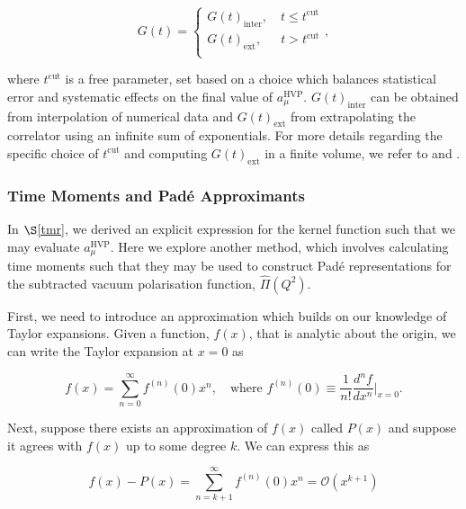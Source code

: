 \documentclass{article}
\numberwithin{equation}{section} %
\begin{document}
\begin{equation}
G(t)=
\begin{cases}
G(t)_{\mathrm{inter}}, \quad t \leq t^{\mathrm{cut}} \\
G(t)_{\mathrm{ext}}, \,\,\,\quad t > t^{\mathrm{cut}} \\
\end{cases},
\end{equation}

\noindent where $t^{\mathrm{cut}}$ is a free parameter, set based on a choice which balances statistical error and systematic effects on the final value of $a_\mu^{\mathrm{HVP}}$. $G(t)_{\mathrm{inter}}$ can be obtained from interpolation of numerical data and $G(t)_{\mathrm{ext}}$ from extrapolating the correlator using an infinite sum of exponentials. For more details regarding the specific choice of $t^{\mathrm{cut}}$ and computing $G(t)_{\mathrm{ext}}$ in a finite volume, we refer to \cite{dellamorte} and \cite{vector}.

\subsubsection{Time Moments and Pad\'{e} Approximants}\label{moments}

In $\S$\ref{tmr}, we derived an explicit expression for the kernel function such that we may evaluate $a_\mu^{\mathrm{HVP}}$. Here we explore another method, which involves calculating time moments such that they may be used to construct Pad\'{e} representations for the subtracted vacuum polarisation function, $\hat{\Pi}(Q^2)$\cite{dellamorte}.

First, we need to introduce an approximation which builds on our knowledge of Taylor expansions. Given a function, $f(x)$, that is analytic about the origin, we can write the Taylor expansion at $x=0$ as

\begin{equation}
f(x) = \sum_{n=0}^\infty f^{(n)}(0)x^n, \quad \mathrm{where}\,\, f^{(n)}(0) \equiv \frac{1}{n!}\frac{d^nf}{dx^n}\bigg\vert_{x=0}.
\end{equation}

Next, suppose there exists an approximation of $f(x)$ called $P(x)$ and suppose it agrees with $f(x)$ up to some degree $k$\cite{pade}. We can express this as 

\begin{equation}
f(x) - P(x) = \sum_{n=k+1}^\infty f^{(n)}(0)x^n = \mathcal{O}(x^{k+1})
\end{equation}
\end{document}
